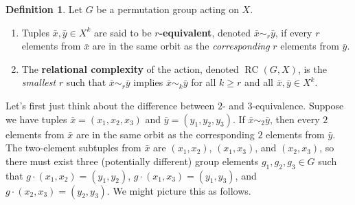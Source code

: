 \documentclass[11pt]{amsart}
\theoremstyle{plain}
\theoremstyle{definition}
\newtheorem*{definition*}{Definition}
\theoremstyle{remark}
\DeclareMathOperator{\rc}{RC}
\begin{document}
\begin{definition*}
Let $G$ be a permutation group acting on $X$.
\begin{enumerate}
\item Tuples $\bar{x},\bar{y} \in X^k$ are said to be \textbf{$r$-equivalent}, denoted $\bar{x}\sim_r\bar{y}$, if {every} $r$ elements from $\bar{x}$ are in the same orbit as the \textit{corresponding} $r$ elements from  $\bar{y}$.
\item The \textbf{relational complexity} of the action, denoted $\rc(G,X)$, is the \emph{smallest} $r$ such that $\bar{x}\sim_r\bar{y}$ implies $\bar{x}\sim_k\bar{y}$  for all $k\ge r$ and all $\bar{x},\bar{y} \in X^k$.
\end{enumerate}
\end{definition*}

Let's first just think about the difference between $2$- and $3$-equivalence. Suppose we have tuples $\bar{x} = (x_1,x_2,x_3)$ and $\bar{y} = (y_1,y_2,y_3)$. If $\bar{x}\sim_2\bar{y}$, then every $2$ elements from $\bar{x}$ are in the same orbit as the corresponding $2$ elements from  $\bar{y}$. The two-element subtuples from $\bar{x}$ are $(x_1,x_2)$, $(x_1,x_3)$, and $(x_2,x_3)$, so there must exist three (potentially different) group elements $g_1,g_2,g_3 \in G$ such that $g\cdot (x_1,x_2) = (y_1,y_2)$, $g\cdot (x_1,x_3) = (y_1,y_3)$, and $g\cdot (x_2,x_3) = (y_2,y_3)$. We might picture this as follows.
\begin{center}
\end{center}
\end{document}
